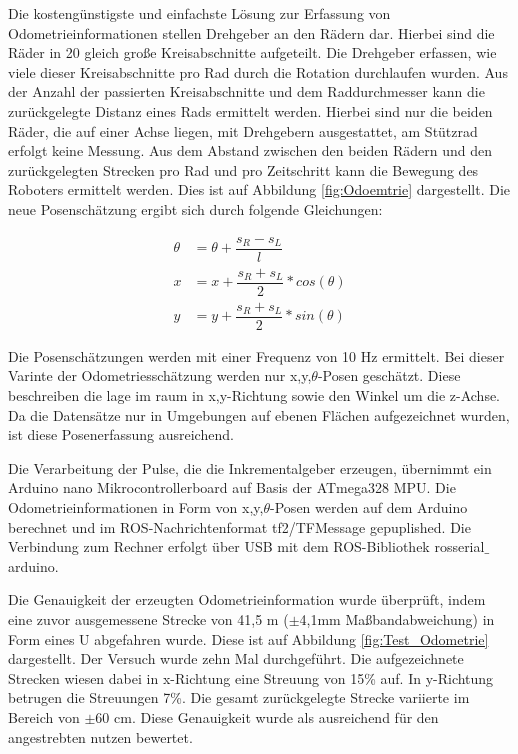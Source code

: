 Die kostengünstigste und einfachste Lösung zur Erfassung von Odometrieinformationen stellen Drehgeber an den Rädern dar. Hierbei sind die Räder in 20 gleich große Kreisabschnitte aufgeteilt. Die Drehgeber erfassen, wie viele dieser Kreisabschnitte pro Rad durch die Rotation durchlaufen wurden. Aus der Anzahl der passierten Kreisabschnitte und dem Raddurchmesser kann die zurückgelegte Distanz eines Rads ermittelt werden. Hierbei sind nur die beiden Räder, die auf einer Achse liegen, mit Drehgebern ausgestattet, am Stützrad erfolgt keine Messung. Aus dem Abstand zwischen den beiden Rädern und den zurückgelegten Strecken pro Rad und pro Zeitschritt kann die Bewegung des Roboters ermittelt werden. Dies ist auf Abbildung \ref{fig:Odoemtrie} dargestellt. Die neue Posenschätzung ergibt sich durch folgende Gleichungen: 

\begin{subequations}
	\begin{align}
		\theta &= \theta + \dfrac{s_R-s_L}{l} \\
		x &= x + \dfrac{s_R+s_L}{2}*cos(\theta) \\
		y &= y + \dfrac{s_R+s_L}{2}*sin(\theta)
	\end{align}
\end{subequations}

Die Posenschätzungen werden mit einer Frequenz von 10 Hz ermittelt. Bei dieser Varinte der Odometriesschätzung werden nur x,y,$\theta$-Posen geschätzt. Diese beschreiben die lage im raum in x,y-Richtung sowie den Winkel um die z-Achse. Da die Datensätze nur in Umgebungen auf ebenen Flächen aufgezeichnet wurden, ist diese Posenerfassung ausreichend.

Die Verarbeitung der Pulse, die die Inkrementalgeber erzeugen, übernimmt ein Arduino nano Mikrocontrollerboard auf Basis der ATmega328 MPU. Die Odometrieinformationen in Form von x,y,$\theta$-Posen werden auf dem Arduino berechnet und im ROS-Nachrichtenformat tf2/TFMessage gepuplished. Die Verbindung zum Rechner erfolgt über USB mit dem ROS-Bibliothek rosserial$\_$arduino. 

Die Genauigkeit der erzeugten Odometrieinformation wurde überprüft, indem eine zuvor ausgemessene Strecke von 41,5 m ($\pm$4,1mm Maßbandabweichung) in Form eines U abgefahren wurde. Diese ist auf Abbildung \ref{fig:Test_Odometrie} dargestellt. Der Versuch wurde zehn Mal durchgeführt. Die aufgezeichnete Strecken wiesen dabei in x-Richtung eine Streuung von 15\% auf. In y-Richtung betrugen die Streuungen 7\%. Die gesamt zurückgelegte Strecke variierte im Bereich von $\pm$60 cm. Diese Genauigkeit wurde als ausreichend für den angestrebten nutzen bewertet.

